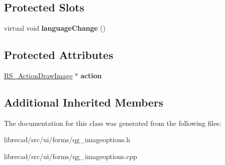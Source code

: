 \subsection*{Protected Slots}
\begin{DoxyCompactItemize}
\item 
\hypertarget{classQG__ImageOptions_a6ea16d4e5f8bc565e1a932ff300df242}{virtual void {\bfseries language\-Change} ()}\label{classQG__ImageOptions_a6ea16d4e5f8bc565e1a932ff300df242}

\end{DoxyCompactItemize}
\subsection*{Protected Attributes}
\begin{DoxyCompactItemize}
\item 
\hypertarget{classQG__ImageOptions_ae48f624c6770a1cab15a858b5173e4f3}{\hyperlink{classRS__ActionDrawImage}{R\-S\-\_\-\-Action\-Draw\-Image} $\ast$ {\bfseries action}}\label{classQG__ImageOptions_ae48f624c6770a1cab15a858b5173e4f3}

\end{DoxyCompactItemize}
\subsection*{Additional Inherited Members}


The documentation for this class was generated from the following files\-:\begin{DoxyCompactItemize}
\item 
librecad/src/ui/forms/qg\-\_\-imageoptions.\-h\item 
librecad/src/ui/forms/qg\-\_\-imageoptions.\-cpp\end{DoxyCompactItemize}
